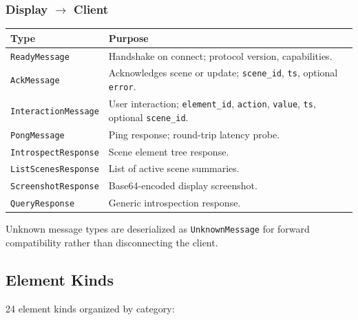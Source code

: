 \documentclass[a4paper,10pt]{article}
\newcommand{\msg}[1]{\texttt{#1}}
\newcommand{\field}[1]{\texttt{#1}}
\begin{document}
\subsubsection{Display $\to$ Client}

\begin{center}
\begin{tabular}{lp{9cm}}
\toprule
\textbf{Type} & \textbf{Purpose} \\
\midrule
\msg{ReadyMessage}       & Handshake on connect; protocol version,
  capabilities. \\
\msg{AckMessage}         & Acknowledges scene or update; \field{scene\_id},
  \field{ts}, optional \field{error}. \\
\msg{InteractionMessage} & User interaction; \field{element\_id},
  \field{action}, \field{value}, \field{ts}, optional
  \field{scene\_id}. \\
\msg{PongMessage}        & Ping response; round-trip latency probe. \\
\msg{IntrospectResponse} & Scene element tree response. \\
\msg{ListScenesResponse} & List of active scene summaries. \\
\msg{ScreenshotResponse} & Base64-encoded display screenshot. \\
\msg{QueryResponse}      & Generic introspection response. \\
\bottomrule
\end{tabular}
\end{center}

Unknown message types are deserialized as \msg{UnknownMessage} for
forward compatibility rather than disconnecting the client.

\subsection{Element Kinds}

24 element kinds organized by category:
\end{document}
